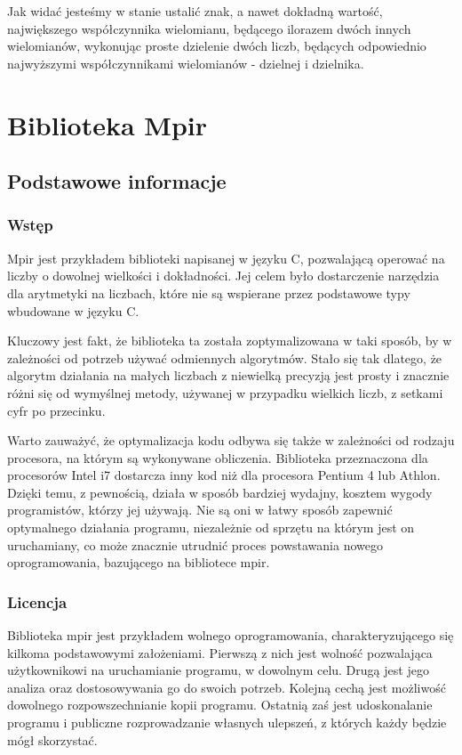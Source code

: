 \documentclass[twoside,a4paper]{book}
\begin{document}
Jak widać jesteśmy w stanie ustalić znak, a nawet dokładną wartość, największego współczynnika wielomianu, będącego ilorazem dwóch innych wielomianów, wykonując proste dzielenie dwóch liczb, będących odpowiednio najwyższymi współczynnikami wielomianów - dzielnej i dzielnika.


\section{Biblioteka Mpir}

\subsection{Podstawowe informacje}

\subsubsection{Wstęp}

Mpir jest przykładem biblioteki napisanej w języku C, pozwalającą operować na liczby o dowolnej wielkości i dokładności. Jej celem było dostarczenie narzędzia dla arytmetyki na liczbach, które nie są wspierane przez podstawowe typy wbudowane w języku C.

Kluczowy jest fakt, że biblioteka ta została zoptymalizowana w taki sposób, by w zależności od potrzeb używać odmiennych algorytmów. Stało się tak dlatego, że algorytm działania na małych liczbach z niewielką precyzją jest prosty i znacznie różni się od wymyślnej metody, używanej w przypadku wielkich liczb, z setkami cyfr po przecinku.

Warto zauważyć, że optymalizacja kodu odbywa się także w zależności od rodzaju procesora, na którym są wykonywane obliczenia. Biblioteka przeznaczona dla procesorów Intel i7 dostarcza inny kod niż dla procesora Pentium 4 lub Athlon. Dzięki temu, z pewnością, działa w sposób bardziej wydajny, kosztem wygody programistów, którzy jej używają. Nie są oni w łatwy sposób zapewnić optymalnego działania programu, niezależnie od sprzętu na którym jest on uruchamiany, co może znacznie utrudnić proces powstawania nowego oprogramowania, bazującego na bibliotece mpir.

\subsubsection{Licencja}

Biblioteka mpir jest przykładem wolnego oprogramowania, charakteryzującego się kilkoma podstawowymi założeniami. Pierwszą z nich jest wolność pozwalająca użytkownikowi na uruchamianie programu, w dowolnym celu. Drugą jest jego analiza oraz dostosowywania go do swoich potrzeb. Kolejną cechą jest możliwość dowolnego rozpowszechnianie kopii programu. Ostatnią zaś jest udoskonalanie programu i publiczne rozprowadzanie własnych ulepszeń, z których każdy będzie mógł skorzystać.
\end{document}

